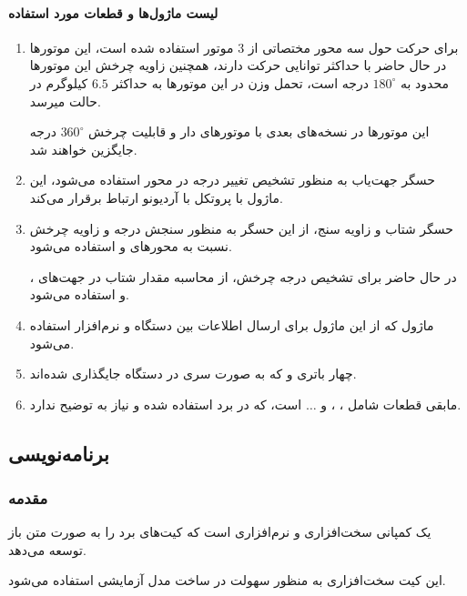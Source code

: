 \documentclass[a4paper,12pt]{report}
\begin{document}
	\paragraph{
	لیست ماژول‌ها و قطعات مورد استفاده}
	\begin{enumerate}[nosep]
		\item
			برای حرکت حول سه محور مختصاتی از
			$3$
			موتور
			استفاده شده است، این موتور‌ها در حال حاضر با حداکثر
			توانایی حرکت دارند، همچنین زاویه چرخش این موتور‌ها محدود به
			$180^{\circ}$
			درجه است، تحمل وزن در این موتور‌ها به حداکثر
			$ 6.5 $
			کیلوگرم در حالت
			میرسد.

			این موتور‌ها در نسخه‌های بعدی با موتور‌های
			دار و قابلیت چرخش
			$360^{\circ}$
			درجه جایگزین خواهند شد.
		\item
			حسگر جهت‌یاب به منظور تشخیص تغییر درجه در محور
			استفاده می‌شود، این ماژول با پروتکل
			با آردیونو ارتباط برقرار می‌کند.
		\item
			حسگر شتاب و زاویه سنج، از این حسگر به منظور سنجش درجه‌ و زاویه چرخش نسبت به محور‌های
			و
			استفاده می‌شود.

			\danger
			در حال حاضر برای تشخیص درجه چرخش، از محاسبه مقدار شتاب در جهت‌های
			،  و  
			استفاده می‌شود.
		\item
			ماژول
			که از این ماژول برای ارسال اطلاعات بین دستگاه و نرم‌افزار استفاده می‌شود.
		\item
			چهار باتری
			 و
			که به صورت سری در دستگاه جایگذاری شده‌اند.
			   ‍
		\item
		مابقی قطعات شامل
		،  ، 
		و
		$\dots$
		 است، که در برد استفاده شده و نیاز به توضیح ندارد.
	\end{enumerate}
	\subsection{
	برنامه‌نویسی
	}\label{subsec1:sec3:chap2}
	\subsubsection{
	مقدمه}
	\label{subsubsec1:subsec1:sec3:chap2}
	یک کمپانی سخت‌افزاری و نرم‌افزاری است که کیت‌های برد
	را به صورت متن باز توسعه می‌دهد.

	این کیت سخت‌افزاری به منظور سهولت در ساخت مدل آزمایشی استفاده می‌شود.
\end{document}
